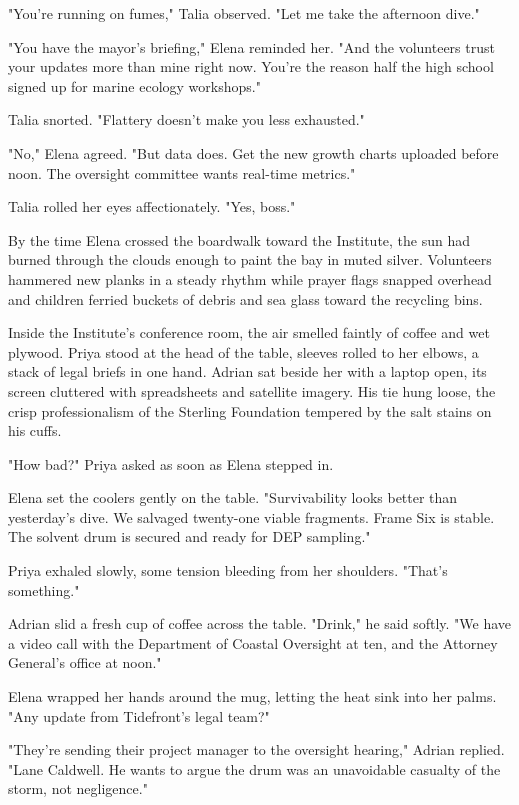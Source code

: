 "You're running on fumes," Talia observed. "Let me take the afternoon dive."

"You have the mayor's briefing," Elena reminded her. "And the volunteers trust your updates more than mine right now. You're the reason half the high school signed up for marine ecology workshops."

Talia snorted. "Flattery doesn't make you less exhausted."

"No," Elena agreed. "But data does. Get the new growth charts uploaded before noon. The oversight committee wants real-time metrics."

Talia rolled her eyes affectionately. "Yes, boss."

By the time Elena crossed the boardwalk toward the Institute, the sun had burned through the clouds enough to paint the bay in muted silver. Volunteers hammered new planks in a steady rhythm while prayer flags snapped overhead and children ferried buckets of debris and sea glass toward the recycling bins.

Inside the Institute's conference room, the air smelled faintly of coffee and wet plywood. Priya stood at the head of the table, sleeves rolled to her elbows, a stack of legal briefs in one hand. Adrian sat beside her with a laptop open, its screen cluttered with spreadsheets and satellite imagery. His tie hung loose, the crisp professionalism of the Sterling Foundation tempered by the salt stains on his cuffs.

"How bad?" Priya asked as soon as Elena stepped in.

Elena set the coolers gently on the table. "Survivability looks better than yesterday's dive. We salvaged twenty-one viable fragments. Frame Six is stable. The solvent drum is secured and ready for DEP sampling."

Priya exhaled slowly, some tension bleeding from her shoulders. "That's something."

Adrian slid a fresh cup of coffee across the table. "Drink," he said softly. "We have a video call with the Department of Coastal Oversight at ten, and the Attorney General's office at noon."

Elena wrapped her hands around the mug, letting the heat sink into her palms. "Any update from Tidefront's legal team?"

"They're sending their project manager to the oversight hearing," Adrian replied. "Lane Caldwell. He wants to argue the drum was an unavoidable casualty of the storm, not negligence."

